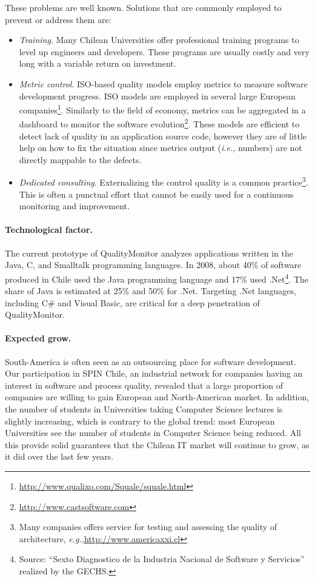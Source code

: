 \documentclass[runningheads]{llncs}
\newcommand{\ie}{\emph{i.e.,}\xspace}
\newcommand{\eg}{\emph{e.g.,}\xspace}
\newcommand{\seclabel}[1]{\label{sec:#1}}
\begin{document}
These problems are well known. Solutions that are commonly employed to prevent or address them are:
\begin{itemize}
\item \emph{Training}. Many Chilean Universities offer professional training programs to level up engineers and developers. These programs are usually costly and very long with a variable return on investment. 

\item \emph{Metric control}. ISO-based quality models employ metrics to measure software development progress. ISO models are employed in several large European companies\footnote{\url{http://www.qualixo.com/Squale/squale.html}}. Similarly to the field of economy, metrics can be aggregated in a dashboard to monitor the software evolution\footnote{\url{http://www.castsoftware.com}}. These models are efficient to detect lack of quality in an application source code, however they are of little help on how to fix the situation since metrics output (\ie numbers) are not directly mappable to the defects.


\item \emph{Dedicated consulting}. Externalizing the control quality is a common practice\footnote{Many companies offers service for testing and assessing the quality of architecture, \eg \url{http://www.americaxxi.cl}}. This is often a punctual effort that cannot be easily used for a continuous monitoring and improvement.
\end{itemize}

\seclabel{technologicalfactor}
\paragraph{Technological factor.} The current prototype of QualityMonitor analyzes applications written in the Java, C, and Smalltalk programming languages. In 2008, about 40\% of software produced in Chile used the Java programming language and 17\% used .Net\footnote{Source: ``Sexto Diagnostico de la Industria Nacional de Software y Servicios'' realized by the GECHS.}. The share of Java is estimated at 25\% and 50\% for .Net. Targeting .Net languages, including C\# and Visual Basic, are critical for a deep penetration of QualityMonitor.

\paragraph{Expected grow.} South-America is often seen as an outsourcing place for software development. Our participation in SPIN Chile, an industrial network for companies having an interest in software and process quality, revealed that a large proportion of companies are willing to gain European and North-American market. In addition, the number of students in Universities taking Computer Science lectures is slightly increasing, which is contrary to the global trend: most European Universities see the number of students in Computer Science being reduced. All this provide solid guarantees that the Chilean IT market will continue to grow, as it did over the last few years.
\end{document}
